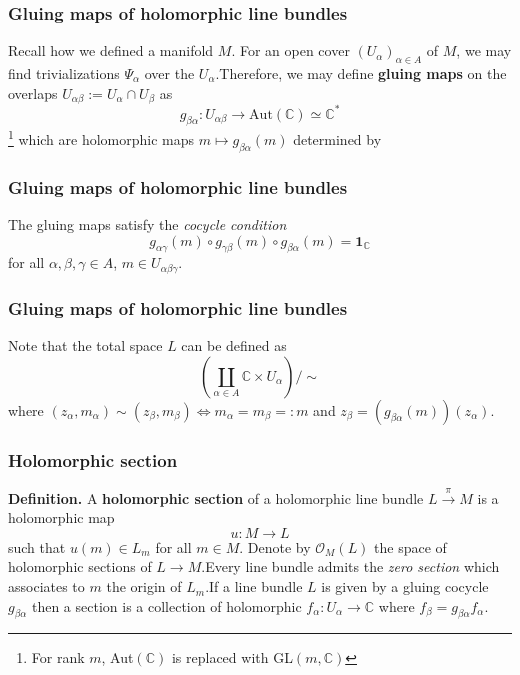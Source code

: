 \documentclass{beamer}
\begin{document}
\begin{frame}
\frametitle{Gluing maps of holomorphic line bundles}

Recall how we defined a manifold $M$. For an open cover $(U_\alpha)_{\alpha \in A}$ of $M$, we may find trivializations $\Psi_\alpha$ over the $U_\alpha$.\newline Therefore, we may define \textbf{gluing maps} on the overlaps $U_{\alpha\beta} := U_\alpha\cap U_\beta$ as \[g_{\beta\alpha} : U_{\alpha\beta} \to \text{Aut}(\mathbb{C})\simeq \mathbb{C}^*\]\footnote{For rank $m$, Aut$(\mathbb{C})$ is replaced with GL$(m,\mathbb{C})$} which are holomorphic maps $m\mapsto g_{\beta\alpha}(m)$ determined by

\end{frame}


\begin{frame}
\frametitle{Gluing maps of holomorphic line bundles}

The gluing maps satisfy the \textit{cocycle condition} \[g_{\alpha\gamma}(m)\circ g_{\gamma\beta}(m)\circ g_{\beta\alpha}(m)= \mathbf{1}_{\mathbb{C}}\] for all $\alpha,\beta,\gamma\in A$, $m \in U_{\alpha\beta\gamma}$.

\end{frame}

\begin{frame}
\frametitle{Gluing maps of holomorphic line bundles}

Note that the total space $L$ can be defined as \[\left(\coprod_{\alpha \in A}\mathbb{C}\times U_\alpha\right)/\sim\] where $(z_\alpha,m_\alpha) \sim (z_\beta,m_\beta) \iff m_\alpha = m_\beta =: m$ and $z_\beta = (g_{\beta\alpha}(m))(z_\alpha)$.

\end{frame}

\begin{frame}
\frametitle{Holomorphic section}

\textbf{Definition.} A \textbf{holomorphic section} of a holomorphic line bundle $L \xrightarrow{\pi}M$ is a holomorphic map \[u:M \to L\] such that $u(m) \in L_m$ for all $m \in M$. Denote by $\mathcal{O}_M(L)$ the space of holomorphic sections of $L \to M$.\newline Every line bundle admits the \textit{zero section} which associates to $m$ the origin of $L_m$.\newline If a line bundle $L$ is given by a gluing cocycle $g_{\beta\alpha}$ then a section is a collection of holomorphic $f_\alpha:U_\alpha \to \mathbb{C}$ where $f_\beta = g_{\beta\alpha}f_\alpha$.

\end{frame}
\end{document}
